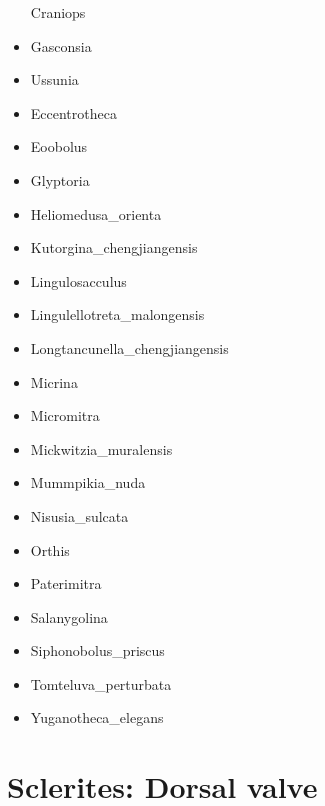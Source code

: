 \documentclass[openany]{book}
\theoremstyle{definition}
\theoremstyle{definition}
\theoremstyle{definition}
\theoremstyle{remark}
\begin{document}
\begin{itemize}
  Craniops\\
\item
  Gasconsia\\
\item
  Ussunia\\
\item
  Eccentrotheca\\
\item
  Eoobolus\\
\item
  Glyptoria\\
\item
  Heliomedusa\_orienta\\
\item
  Kutorgina\_chengjiangensis\\
\item
  Lingulosacculus\\
\item
  Lingulellotreta\_malongensis\\
\item
  Longtancunella\_chengjiangensis\\
\item
  Micrina\\
\item
  Micromitra\\
\item
  Mickwitzia\_muralensis\\
\item
  Mummpikia\_nuda\\
\item
  Nisusia\_sulcata\\
\item
  Orthis\\
\item
  Paterimitra\\
\item
  Salanygolina\\
\item
  Siphonobolus\_priscus\\
\item
  Tomteluva\_perturbata\\
\item
  Yuganotheca\_elegans
\end{itemize}

\section{Sclerites: Dorsal valve}\label{sclerites-dorsal-valve}
\end{document}

